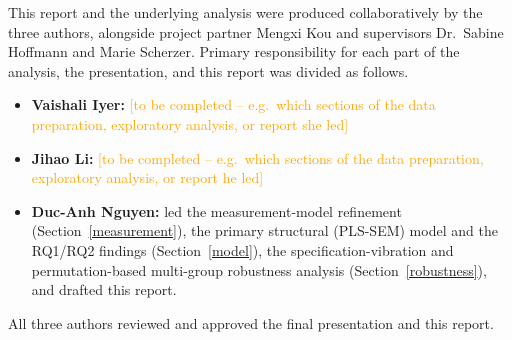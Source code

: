 This report and the underlying analysis were produced collaboratively by the
three authors, alongside project partner Mengxi Kou and supervisors
Dr.\ Sabine Hoffmann and Marie Scherzer. Primary responsibility for each part
of the analysis, the presentation, and this report was divided as follows.

\begin{itemize}
  \item \textbf{Vaishali Iyer:} \textcolor{orange}{[to be completed --
    e.g.\ which sections of the data preparation, exploratory analysis, or
    report she led]}
  \item \textbf{Jihao Li:} \textcolor{orange}{[to be completed -- e.g.\
    which sections of the data preparation, exploratory analysis, or report
    he led]}
  \item \textbf{Duc-Anh Nguyen:} led the measurement-model refinement
    (Section~\ref{measurement}), the primary structural (PLS-SEM) model and
    the RQ1/RQ2 findings (Section~\ref{model}), the specification-vibration
    and permutation-based multi-group robustness analysis
    (Section~\ref{robustness}), and drafted this report.
\end{itemize}

All three authors reviewed and approved the final presentation and this
report.
